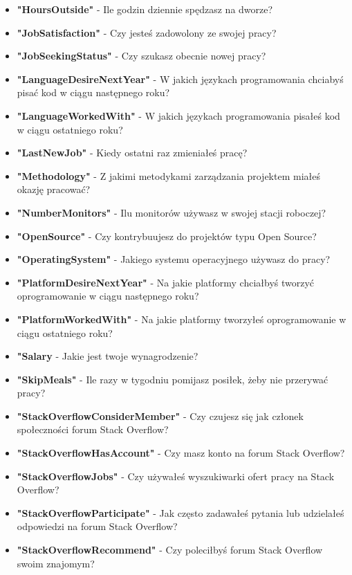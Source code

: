\begin{appendices}
\begin{itemize}
        \item \textbf{"HoursOutside"} - Ile godzin dziennie spędzasz na dworze?
        \item \textbf{"JobSatisfaction"} - Czy jesteś zadowolony ze swojej pracy?
        \item \textbf{"JobSeekingStatus"} - Czy szukasz obecnie nowej pracy?
        \item \textbf{"LanguageDesireNextYear"} - W jakich językach programowania chciabyś pisać kod w ciągu następnego roku?
        \item \textbf{"LanguageWorkedWith"} - W jakich językach programowania pisałeś kod w ciągu ostatniego roku?
        \item \textbf{"LastNewJob"} - Kiedy ostatni raz zmieniałeś pracę?
        \item \textbf{"Methodology"} - Z jakimi metodykami zarządzania projektem miałeś okazję pracować?
        \item \textbf{"NumberMonitors"} - Ilu monitorów używasz w swojej stacji roboczej?
        \item \textbf{"OpenSource"} - Czy kontrybuujesz do projektów typu Open Source?
        \item \textbf{"OperatingSystem"} - Jakiego systemu operacyjnego używasz do pracy?
        \item \textbf{"PlatformDesireNextYear"} - Na jakie platformy chciałbyś tworzyć oprogramowanie w ciągu następnego roku?
        \item \textbf{"PlatformWorkedWith"} - Na jakie platformy tworzyłeś oprogramowanie w ciągu ostatniego roku?
        \item \textbf{"Salary} - Jakie jest twoje wynagrodzenie?
        \item \textbf{"SkipMeals"} - Ile razy w tygodniu pomijasz posiłek, żeby nie przerywać pracy?
        \item \textbf{"StackOverflowConsiderMember"} - Czy czujesz się jak członek społeczności forum Stack Overflow?
        \item \textbf{"StackOverflowHasAccount"} - Czy masz konto na forum Stack Overflow?
        \item \textbf{"StackOverflowJobs"} - Czy używałeś wyszukiwarki ofert pracy na Stack Overflow?
        \item \textbf{"StackOverflowParticipate"} - Jak często zadawałeś pytania lub udzielałeś odpowiedzi na forum Stack Overflow?
        \item \textbf{"StackOverflowRecommend"} - Czy poleciłbyś forum Stack Overflow swoim znajomym?

\end{itemize}
\end{appendices}
